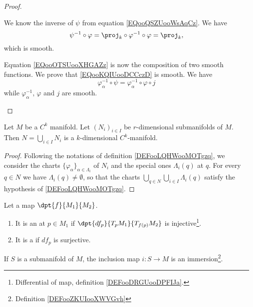 \begin{proof}
\begin{subproof}
		We know the inverse of \( \psi\) from equation \eqref{EQooQSZUooWsAqCz}. We have
		\begin{equation}
			\psi^{-1}\circ\varphi=\proj_k\circ\varphi^{-1}\circ\varphi=\proj_k,
		\end{equation}
		which is smooth.

		Equation \eqref{EQooOTSUooXHGAZz} is now the composition of two smooth functions.
		We prove that \eqref{EQooKQIUooDCCczD} is smooth. We have
		\begin{equation}
			\varphi_{\alpha}^{-1}\circ\psi=\varphi_{\alpha}^{-1}\circ\varphi\circ j
		\end{equation}
		while \( \varphi_{\alpha}^{-1}\), \( \varphi\) and \( j\) are smooth.
	\end{subproof}
\end{proof}

\begin{proposition}	\label{PROPooFFDYooLmwISw}
	Let \( M\) be a \( C^k\) manifold. Let \( (N_i)_{i\in I}\) be \( r\)-dimensional submanifolds of \( M\). Then \( N=\bigcup_{i\in I}N_i\) is a \( k\)-dimensional \( C^k\)-manifold.
\end{proposition}

\begin{proof}
	Following the notations of definition \ref{DEFooLQHWooMOTgzq}, we consider the charts \( \{ \varphi_{\alpha} \}_{\alpha\in\Lambda_i}\) of \( N_i\) and the special ones \( \Lambda_i(q)\) at \( q\). For every \( q\in N\) we have \( \Lambda_i(q)\neq \emptyset\), so that the charts \( \bigcup_{q\in N}\bigcup_{i\in I}\Lambda_i(q)\) satisfy the hypothesis of \ref{DEFooLQHWooMOTgzq}.
\end{proof}

\begin{definition}      \label{DEFooZKUIooXWVGvh}
	Let a map $\dpt{f}{M_1}{M_2}$.
	\begin{enumerate}
		\item
		      It is an  at $p\in M_1$ if $\dpt{df_p}{T_pM_1}{T_{f(p)}M_2}$ is injective\footnote{Differential of map, definition \ref{DEFooDRGUooDPFIJa}.}.
		\item
		      It is a  if $df_p$ is surjective.
	\end{enumerate}
\end{definition}


\begin{proposition}       \label{PROPooEWUCooTStAvb}
	If \( S\) is a submanifold of \( M\), the inclusion map \( i\colon S \to M\) is an immersion\footnote{Definition \ref{DEFooZKUIooXWVGvh}}.
\end{proposition}

